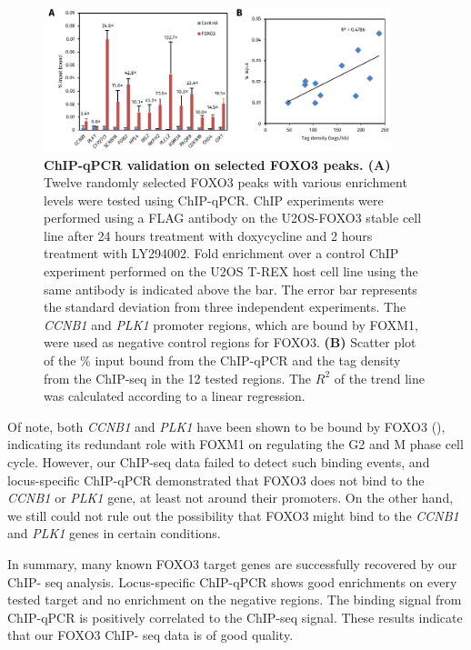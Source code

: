 \begin{figure}[!h]
    \centering
    \includegraphics[width=0.9\textwidth]{chapter3/figures_foxo3/fig40.pdf}
    \caption[ChIP-qPCR validation on selected FOXO3 peaks]{\textbf{ChIP-qPCR validation on selected FOXO3 peaks. (A)} Twelve randomly selected FOXO3 peaks with various enrichment levels were tested using ChIP-qPCR. ChIP experiments were performed using a FLAG antibody on the U2OS-FOXO3 stable cell line after 24 hours treatment with doxycycline and 2 hours treatment with LY294002. Fold enrichment over a control ChIP experiment performed on the U2OS T-REX host cell line using the same antibody is indicated above the bar. The error bar represents the standard deviation from three independent experiments. The \textit{CCNB1} and \textit{PLK1} promoter regions, which are bound by FOXM1, were used as negative control regions for FOXO3. \textbf{(B)} Scatter plot of the \% input bound from the ChIP-qPCR and the tag density from the ChIP-seq in the 12 tested regions. The $R^2$ of the trend line was calculated according to a linear regression.}
    \label{fig:fig40}
\end{figure}

Of note, both \textit{CCNB1} and \textit{PLK1} have been shown to be bound by FOXO3 (\cite{alvarez2001forkhead}), indicating its redundant role with FOXM1 on regulating the G2 and M phase cell cycle. However, our ChIP-seq data failed to detect such binding events, and locus-specific ChIP-qPCR demonstrated that FOXO3 does not bind to the \textit{CCNB1} or \textit{PLK1} gene, at least not around their promoters. On the other hand, we still could not rule out the possibility that FOXO3 might bind to the \textit{CCNB1} and \textit{PLK1} genes in certain conditions.

In summary, many known FOXO3 target genes are successfully recovered by our ChIP- seq analysis. Locus-specific ChIP-qPCR shows good enrichments on every tested target and no enrichment on the negative regions. The binding signal from ChIP-qPCR is positively correlated to the ChIP-seq signal. These results indicate that our FOXO3 ChIP- seq data is of good quality.

